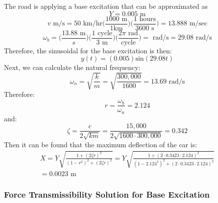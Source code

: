 \documentclass[12pt,letter]{article}
\begin{document}
\begin{example}
			\noindent 
			The road is applying a base excitation that can be approximated as 
			\begin{equation}
				Y = 0.005 \text{ m}
			\end{equation} 				
			\begin{equation}
				v \text{ m/s} = 50 \text{ km/hr}\Bigg(\frac{1000 \text{ m}}{1 \text {km}}\Bigg) \Bigg(\frac{1 \text{ hours}}{3600 \text { s}}\Bigg) = 13.888 \text{ m/sec}
			\end{equation} 	
			\begin{equation}
				\omega_b = \Bigg(\frac{ 13.88 \text{ m}}{s}\Bigg) \Bigg(\frac{ 1 \text{ cycle}}{3 \text{ m}}\Bigg) \Bigg(\frac{ 2 \pi \text{ rad}}{\text {cycle}}\Bigg) = \text{~rad/s} = 29.08 \text{~rad/s} 
			\end{equation} 	
			Therefore, the sinusoidal for the base excitation is then:
			\begin{equation}
				y(t) = (0.005) \text{sin}(29.08 t)
			\end{equation} 	
			Next, we can calculate the natural frequency:
			\begin{equation}
				\omega_n = \sqrt{\frac{k}{m}} = \sqrt{\frac{300,000}{1600}} = 13.69 \text{~rad/s}
			\end{equation} 			
			Therefore:
			\begin{equation}
			r=\frac{\omega_b}{\omega_n}  = 2.124
			\end{equation} 		
			and:
			\begin{equation}
			\zeta = \frac{c}{2\sqrt{km}}= \frac{15,000}{2\sqrt{1600\cdot300,000}} = 0.342
			\end{equation}	
			Then it can be found that the maximum deflection of the car is:
			\begin{equation}
			\begin{split}
			X = Y \sqrt{\frac{1+(2 \zeta r)^2}{(1-r^2)^2 + (2 \zeta r )^2}} = Y \sqrt{\frac{1+(2 \cdot 0.3423 \cdot2.124)^2}{(1-2.124^2)^2 + (2 \cdot 0.3423 \cdot 2.124 )^2}}  \\ = 0.0023 \text{ m}
			\end{split}
			\end{equation} 		
		\end{example}	
			
	\subsubsection{Force Transmissibility Solution for Base Excitation}
	
\end{document}

